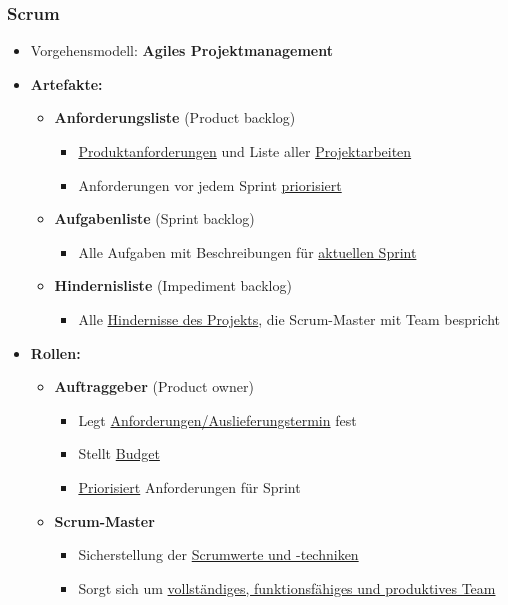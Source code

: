 		\newpage
		\subsubsection{Scrum}
					
			\begin{itemize}
				\item Vorgehensmodell: \textbf{Agiles Projektmanagement}
				\item \textbf{Artefakte:}
				\begin{itemize}
					\item \textbf{Anforderungsliste} (Product backlog)
					\begin{itemize}
						\item \underline{Produktanforderungen} und Liste aller \underline{Projektarbeiten}
						\item Anforderungen vor jedem Sprint \underline{priorisiert}
					\end{itemize}
					\item \textbf{Aufgabenliste} (Sprint backlog)
					\begin{itemize}
						\item Alle Aufgaben mit Beschreibungen für \underline{aktuellen Sprint}
					\end{itemize}
					\item \textbf{Hindernisliste} (Impediment backlog)
					\begin{itemize}
						\item Alle \underline{Hindernisse des Projekts}, die Scrum-Master mit Team bespricht
					\end{itemize}
				\end{itemize}
				\item \textbf{Rollen:}
				\begin{itemize}
					\item \textbf{Auftraggeber} (Product owner)
					\begin{itemize}
						\item Legt \underline{Anforderungen/Auslieferungstermin} fest
						\item Stellt \underline{Budget}
						\item \underline{Priorisiert} Anforderungen für Sprint
					\end{itemize}
					\item \textbf{Scrum-Master}
					\begin{itemize}
						\item Sicherstellung der \underline{Scrumwerte und -techniken}
						\item Sorgt sich um \underline{vollständiges, funktionsfähiges und produktives Team}

\end{itemize}
\end{itemize}
\end{itemize}
